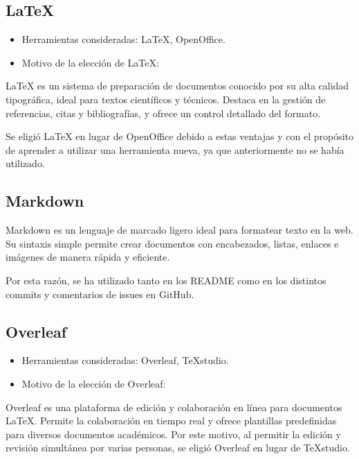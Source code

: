 \subsection{LaTeX}\label{latex}

\begin{itemize}
    \item Herramientas consideradas: LaTeX, OpenOffice.
    \item Motivo de la elección de LaTeX:
\end{itemize}

LaTeX es un sistema de preparación de documentos conocido por su alta calidad tipográfica, ideal para textos científicos y técnicos. Destaca en la gestión de referencias, citas y bibliografías, y ofrece un control detallado del formato.

Se eligió LaTeX en lugar de OpenOffice debido a estas ventajas y con el propósito de aprender a utilizar una herramienta nueva, ya que anteriormente no se había utilizado.

\subsection{Markdown}\label{markdown}

Markdown es un lenguaje de marcado ligero ideal para formatear texto en la web. Su sintaxis simple permite crear documentos con encabezados, listas, enlaces e imágenes de manera rápida y eficiente.

Por esta razón, se ha utilizado tanto en los README como en los distintos commits y comentarios de issues en GitHub.

\subsection{Overleaf}\label{overleaf}

\begin{itemize}
    \item Herramientas consideradas: Overleaf, TeXstudio.
    \item Motivo de la elección de Overleaf:
\end{itemize}

Overleaf es una plataforma de edición y colaboración en línea para documentos LaTeX. Permite la colaboración en tiempo real y ofrece plantillas predefinidas para diversos documentos académicos. Por este motivo, al permitir la edición y revisión simultánea por varias personas, se eligió Overleaf en lugar de TeXstudio.

